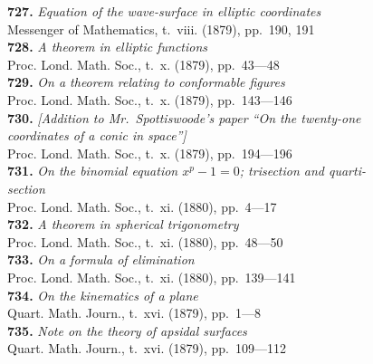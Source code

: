 \documentclass[12pt,a4paper,oneside]{book}
\begin{document}
\small
\noindent\textbf{727.} \textit{Equation of the wave-surface in elliptic coordinates} \\
\hspace*{2em}Messenger of Mathematics, t.~viii. (1879), pp.~190, 191\\[0.4em]
\textbf{728.} \textit{A theorem in elliptic functions} \\
\hspace*{2em}Proc. Lond. Math. Soc., t.~x. (1879), pp.~43---48\\[0.4em]
\textbf{729.} \textit{On a theorem relating to conformable figures} \\
\hspace*{2em}Proc. Lond. Math. Soc., t.~x. (1879), pp.~143---146\\[0.4em]
\textbf{730.} \textit{[Addition to Mr.~Spottiswoode's paper ``On the twenty-one}\\
\hspace*{2em}\textit{coordinates of a conic in space'']} \\
\hspace*{2em}Proc. Lond. Math. Soc., t.~x. (1879), pp.~194---196\\[0.4em]
\textbf{731.} \textit{On the binomial equation $x^p - 1 = 0$; trisection and quarti-}\\
\hspace*{2em}\textit{section} \\
\hspace*{2em}Proc. Lond. Math. Soc., t.~xi. (1880), pp.~4---17\\[0.4em]
\textbf{732.} \textit{A theorem in spherical trigonometry} \\
\hspace*{2em}Proc. Lond. Math. Soc., t.~xi. (1880), pp.~48---50\\[0.4em]
\textbf{733.} \textit{On a formula of elimination} \\
\hspace*{2em}Proc. Lond. Math. Soc., t.~xi. (1880), pp.~139---141\\[0.4em]
\textbf{734.} \textit{On the kinematics of a plane} \\
\hspace*{2em}Quart. Math. Journ., t.~xvi. (1879), pp.~1---8\\[0.4em]
\textbf{735.} \textit{Note on the theory of apsidal surfaces} \\
\hspace*{2em}Quart. Math. Journ., t.~xvi. (1879), pp.~109---112\\[0.4em]
\end{document}
